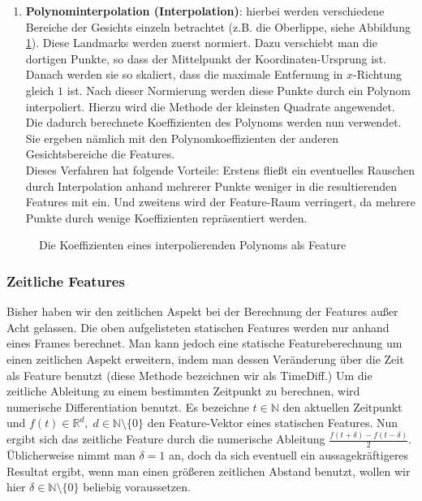 \begin{enumerate}
      \item \textbf{Polynominterpolation (Interpolation)}:
     hierbei werden verschiedene Bereiche der Gesichts einzeln betrachtet (z.B. die Oberlippe, siehe Abbildung \ref{fig:interpol}).
     Diese Landmarks werden zuerst normiert. Dazu verschiebt man die dortigen Punkte, so dass der Mittelpunkt der Koordinaten-Ursprung ist. Danach werden sie so skaliert, dass die maximale Entfernung in $x$-Richtung gleich $1$ ist.
     Nach dieser Normierung werden diese Punkte durch ein Polynom interpoliert. Hierzu wird die Methode der kleinsten Quadrate angewendet. Die dadurch berechnete Koeffizienten des Polynoms werden nun verwendet. Sie ergeben nämlich mit den Polynomkoeffizienten der anderen Gesichtsbereiche die Features.\\
     Dieses Verfahren hat folgende Vorteile:
     Erstens fließt ein eventuelles Rauschen durch Interpolation anhand mehrerer Punkte  weniger in die resultierenden Features mit ein. Und zweitens wird der Feature-Raum verringert, da mehrere Punkte durch wenige Koeffizienten repräsentiert werden.
\end{enumerate}
\begin{figure}
  \center
\scalebox{ 0.9 }{

}
\caption{Die Koeffizienten eines interpolierenden Polynoms als Feature}
\label{fig:interpol}
\end{figure}

\subsubsection{Zeitliche Features}
Bisher haben wir den zeitlichen Aspekt bei der Berechnung der Features außer Acht gelassen. Die oben aufgelisteten statischen Features werden nur anhand eines Frames berechnet.
Man kann jedoch eine statische Featureberechnung um einen zeitlichen Aspekt erweitern, indem man dessen Veränderung über die Zeit als Feature benutzt (diese Methode bezeichnen wir als TimeDiff.)
Um die zeitliche Ableitung zu einem bestimmten Zeitpunkt zu berechnen, wird
numerische Differentiation benutzt. Es bezeichne $t\in\mathbb{N}$ den aktuellen Zeitpunkt und $f(t)\in\mathbb{R}^d,\;d\in\mathbb{N}\setminus\{0\}$ den Feature-Vektor eines statischen Features. Nun ergibt sich das zeitliche Feature durch die numerische Ableitung $\frac{f(t+\delta)-f(t-\delta)}{2}$. Üblicherweise nimmt man $\delta=1$ an, doch da sich eventuell ein aussagekräftigeres Resultat ergibt, wenn man einen größeren zeitlichen Abstand benutzt, wollen wir hier $\delta\in\mathbb{N}\setminus\{0\}$  beliebig voraussetzen.

